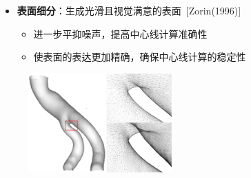 \begin{frame}
\begin{itemize}
  \item \textbf{表面细分}：生成光滑且视觉满意的表面~[Zorin(1996)]
  \begin{itemize}
    \item 进一步平抑噪声，提高中心线计算准确性
    \item 使表面的表达更加精确，确保中心线计算的稳定性
  \end{itemize}
\end{itemize}
\begin{figure}[t]
\centering
\includegraphics[height=1.5in]{../../Figures/postprocessing/centerlines/subdivision.eps}
\end{figure}
\end{frame} 


